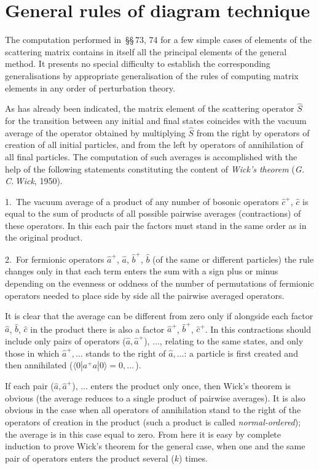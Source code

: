 \section{General rules of diagram technique}

The computation performed in~\S\S\,73, 74 for a few simple cases of elements of the scattering matrix contains in itself all the principal elements of the general method. It presents no special difficulty to establish the corresponding generalisations by appropriate generalisation of the rules of computing matrix elements in any order of perturbation theory.

As has already been indicated, the matrix element of the scattering operator $\hat{S}$ for the transition between any initial and final states coincides with the vacuum average of the operator obtained by multiplying $\hat{S}$ from the right by operators of creation of all initial particles, and from the left by operators of annihilation of all final particles. The computation of such averages is accomplished with the help of the following statements constituting the content of \textit{Wick's theorem} (\textit{G.\,C.\,Wick}, 1950).

1.~The vacuum average of a product of any number of bosonic operators $\hat{c}^+$, $\hat{c}$ is equal to the sum of products of all possible pairwise averages (contractions) of these operators. In this each pair the factors must stand in the same order as in the original product.

2.~For fermionic operators $\hat{a}^+$, $\hat{a}$, $\hat{b}^+$, $\hat{b}$ (of the same or different particles) the rule changes only in that each term enters the sum with a sign plus or minus depending on the evenness or oddness of the number of permutations of fermionic operators needed to place side by side all the pairwise averaged operators.

It is clear that the average can be different from zero only if alongside each factor $\hat{a}$, $\hat{b}$, $\hat{c}$ in the product there is also a factor $\hat{a}^+$, $\hat{b}^+$, $\hat{c}^+$. In this contractions should include only pairs of operators ($\hat{a}, \hat{a}^+$), $\ldots$, relating to the same states, and only those in which $\hat{a}^+, \ldots$ stands to the right of $\hat{a}, \ldots$: a particle is first created and then annihilated ($\langle 0|a^+a|0\rangle = 0, \ldots$\,).

If each pair ($\hat{a}, \hat{a}^+$), $\ldots$ enters the product only once, then Wick's theorem is obvious (the average reduces to a single product of pairwise averages). It is also obvious in the case when all operators of annihilation stand to the right of the operators of creation in the product (such a product is called \textit{normal-ordered}); the average is in this case equal to zero. From here it is easy by complete induction to prove Wick's theorem for the general case, when one and the same pair of operators enters the product several ($k$) times.

